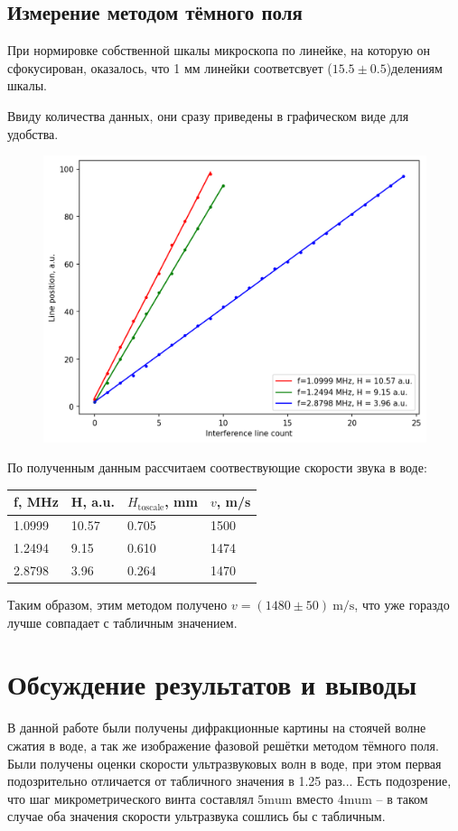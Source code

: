 \documentclass[12pt, a4paper]{article}
\begin{document}
\subsection{Измерение методом тёмного поля}
При нормировке собственной шкалы микроскопа по линейке, на которую он сфокусирован, оказалось, что
1 мм линейки соответсвует ($15.5\pm0.5$)делениям шкалы.

Ввиду количества данных, они сразу приведены в графическом виде для удобства.
\begin{figure}[H]
  \includegraphics[width=0.75\linewidth]{pics/dark field.png}
\end{figure}

По полученным данным рассчитаем соотвествующие скорости звука в воде:
\begin{table}[H]
  \begin{tabular}{|l|l|l|l|}
  \hline
  f, MHz & H, a.u. & $H_\text{toscale}$, mm & $v$, m/s \\ \hline
  1.0999 & 10.57   & 0.705          & 1500   \\ \hline
  1.2494 & 9.15    & 0.610          & 1474   \\ \hline
  2.8798 & 3.96    & 0.264          & 1470   \\ \hline
  \end{tabular}
\end{table}

Таким образом, этим методом получено $v = (1480\pm50)~\mathrm{m/s}$, что уже гораздо лучше совпадает с табличным значением.
\section{Обсуждение результатов и выводы}
В данной работе были получены дифракционные картины на стоячей волне сжатия в воде, а так же
изображение фазовой решётки методом тёмного поля. Были получены оценки скорости ультразвуковых волн
в воде, при этом первая подозрительно отличается от табличного значения в 1.25 раз... Есть подозрение,
что шаг микрометрического винта составлял $5\mathrm{mu m}$ вместо $4\mathrm{mu m}$ -- в таком случае оба значения
скорости ультразвука сошлись бы с табличным.
\end{document}
